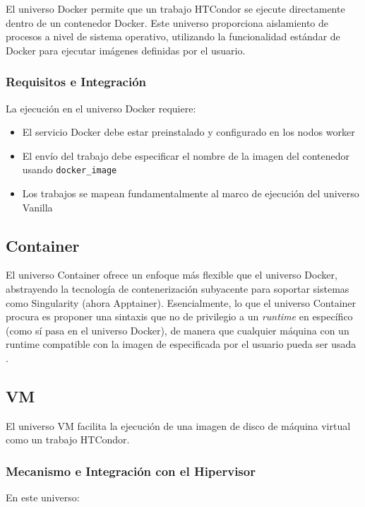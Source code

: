 El universo Docker permite que un trabajo HTCondor se ejecute directamente dentro de un contenedor Docker. Este universo proporciona aislamiento de procesos a nivel de sistema operativo, utilizando la funcionalidad estándar de Docker para ejecutar imágenes definidas por el usuario.

\subsubsection{Requisitos e Integración}

La ejecución en el universo Docker requiere:

\begin{itemize}
	\item El servicio Docker debe estar preinstalado y configurado en los nodos worker
	\item El envío del trabajo debe especificar el nombre de la imagen del contenedor usando \texttt{docker\_image}
	\item Los trabajos se mapean fundamentalmente al marco de ejecución del universo Vanilla
\end{itemize}


\subsection{Container}

El universo Container ofrece un enfoque más flexible que el universo Docker, abstrayendo la tecnología de contenerización subyacente para soportar sistemas como Singularity (ahora Apptainer). Esencialmente, lo que el universo Container procura es proponer una sintaxis que no de privilegio a un \textit{runtime} en específico  (como sí pasa en el universo Docker), de manera que cualquier máquina con un runtime compatible con la imagen de especificada por el usuario pueda ser usada \citep{HTCondor-env-services}.


\subsection{VM}

El universo VM facilita la ejecución de una imagen de disco de máquina virtual como un trabajo HTCondor.
\subsubsection{Mecanismo e Integración con el Hipervisor}

En este universo:

